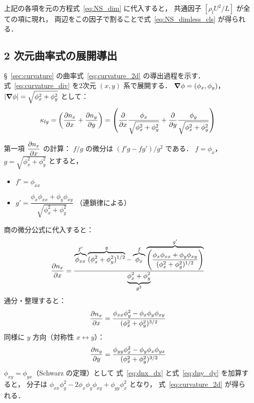 上記の各項を元の方程式~\eqref{eq:NS_dim} に代入すると，
共通因子 $[\rho_l U^2/L]$ が全ての項に現れ，
両辺をこの因子で割ることで式~\eqref{eq:NS_dimless_cls} が得られる．

\subsection{2 次元曲率式の展開導出}
\label{app:curvature_2d_derivation}

§~\ref{sec:curvature} の曲率式~\eqref{eq:curvature_2d} の導出過程を示す．
式~\eqref{eq:curvature_div} を2次元 $(x,y)$ 系で展開する．
$\bm{\nabla}\phi = (\phi_x, \phi_y)$，
$|\bm{\nabla}\phi| = \sqrt{\phi_x^2 + \phi_y^2}$ として：
\[
  \kappa_{lg} = \left( \dfrac{\partial n_x}{\partial x} + \dfrac{\partial n_y}{\partial y} \right)
  = \left(
      \dfrac{\partial }{\partial x}\frac{\phi_x}{\sqrt{\phi_x^2+\phi_y^2}}
      + \dfrac{\partial }{\partial y}\frac{\phi_y}{\sqrt{\phi_x^2+\phi_y^2}}
    \right)
\]

第一項 $\dfrac{\partial n_x}{\partial x}$ の計算：
$f/g$ の微分は $(f'g - fg')/g^2$ である．
$f=\phi_x$，$g=\sqrt{\phi_x^2+\phi_y^2}$ とすると，
\begin{itemize}
    \item $f' = \phi_{xx}$
    \item $g' = \dfrac{\phi_x\phi_{xx} + \phi_y\phi_{xy}}{\sqrt{\phi_x^2+\phi_y^2}}$
    \quad（連鎖律による）
\end{itemize}
商の微分公式に代入すると：
\begin{equation}
 \dfrac{\partial n_x}{\partial x}
 = \frac{
     \overbrace{\phi_{xx}}^{f'}
     \overbrace{(\phi_x^2+\phi_y^2)^{1/2}}^{g}
     -
     \overbrace{\phi_x}^{f}
     \overbrace{\left(\dfrac{\phi_x\phi_{xx} + \phi_y\phi_{xy}}{(\phi_x^2+\phi_y^2)^{1/2}}\right)}^{g'}
   }{\underbrace{\phi_x^2+\phi_y^2}_{g^2}}
 \label{eq:dnx_dx_raw}
\end{equation}
通分・整理すると：
\begin{equation}
 \dfrac{\partial n_x}{\partial x}
 = \frac{\phi_{xx}\phi_y^2 - \phi_x\phi_y\phi_{xy}}{(\phi_x^2+\phi_y^2)^{3/2}}
 \label{eq:dnx_dx}
\end{equation}
同様に $y$ 方向（対称性 $x \leftrightarrow y$）：
\begin{equation}
  \dfrac{\partial n_y}{\partial y}
  = \frac{\phi_{yy}\phi_x^2 - \phi_y\phi_x\phi_{yx}}{(\phi_x^2+\phi_y^2)^{3/2}}
  \label{eq:dny_dy}
\end{equation}
$\phi_{xy}=\phi_{yx}$（Schwarz の定理）として
式~\eqref{eq:dnx_dx} と式~\eqref{eq:dny_dy} を加算すると，
分子は $\phi_{xx}\phi_y^2 - 2\phi_x\phi_y\phi_{xy} + \phi_{yy}\phi_x^2$ となり，
式~\eqref{eq:curvature_2d} が得られる．

